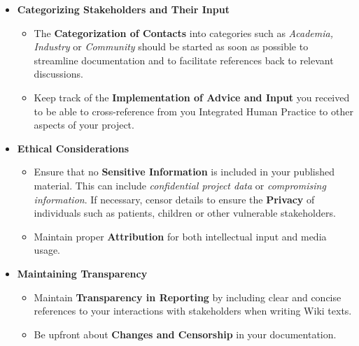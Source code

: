 \begin{itemize}
    \item \textbf{Categorizing Stakeholders and Their Input}
    \begin{itemize} 
    \item The \textbf{Categorization of Contacts} into categories such as \textit{Academia, Industry} or \textit{Community} should be started as soon as possible to streamline documentation and to facilitate references back to relevant discussions.
    \item Keep track of the \textbf{Implementation of Advice and Input} you received to be able to cross-reference from you Integrated Human Practice to other aspects of your project.
    \end{itemize}
    \item \textbf{Ethical Considerations}
    \begin{itemize}
        \item Ensure that no \textbf{Sensitive Information} is included in your published material.
        This can include \textit{confidential project data} or \textit{compromising information}.
        If necessary, censor details to ensure the \textbf{Privacy} of individuals such as patients, children or other vulnerable stakeholders.
        \item Maintain proper \textbf{Attribution} for both intellectual input and media usage.
    \end{itemize}
    \item \textbf{Maintaining Transparency}
    \begin{itemize}
        \item Maintain \textbf{Transparency in Reporting} by including clear and concise references to your interactions with stakeholders when writing Wiki texts.
        \item Be upfront about \textbf{Changes and Censorship} in your documentation.
    \end{itemize}
\end{itemize}
